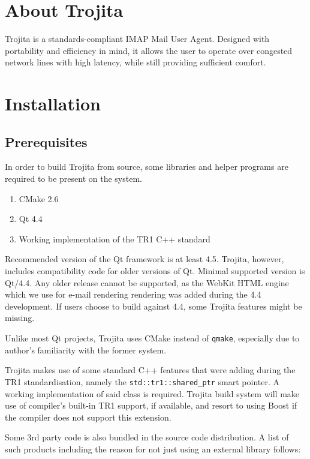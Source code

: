 \documentclass[12pt,notitlepage]{report}
\newcommand{\trojita}{Trojita\xspace}
\begin{document}
\section{About Trojita}

\trojita is a standards-compliant IMAP Mail User Agent. Designed with portability
and efficiency in mind, it allows the user to operate over congested network
lines with high latency, while still providing sufficient comfort.

\section{Installation}

\subsection{Prerequisites}

In order to build \trojita from source, some libraries and helper programs are
required to be present on the system.

\begin{enumerate}
    \item{CMake 2.6}
    \item{Qt 4.4}
    \item{Working implementation of the TR1 C++ standard}
\end{enumerate}

Recommended version of the Qt framework \cite{qt} is at least 4.5. \trojita,
however, includes compatibility code for older versions of Qt. Minimal supported
version is Qt/4.4. Any older release cannot be supported, as the WebKit HTML
engine which we use for e-mail rendering rendering was added during the 4.4
development. If users choose to build against 4.4, some \trojita features might
be missing.

Unlike most Qt projects, \trojita uses CMake \cite{cmake} instead of {\tt qmake},
especially due to author's familiarity with the former system.

\trojita makes use of some standard C++ features that were adding during the TR1
\cite{std-tr1} standardisation, namely the {\tt std::tr1::shared\_ptr} smart
pointer. A working implementation of said class is required.  \trojita build
system will make use of compiler's built-in TR1 support, if available, and
resort to using Boost if the compiler does not support this extension.

Some 3rd party code is also bundled in the source code distribution.  A list of
such products including the reason for not just using an external library
follows:
\end{document}
